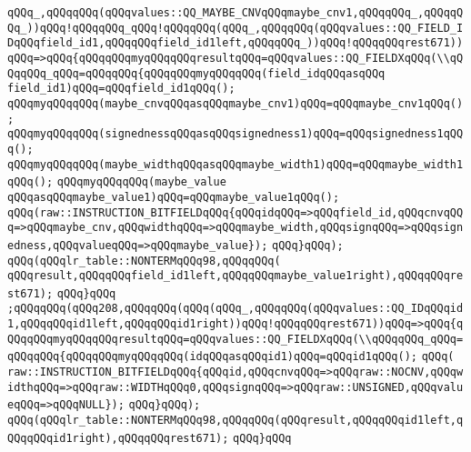 \verb|qQQq_,qQQqqQQq(qQQqvalues::QQ_MAYBE_CNVqQQqmaybe_cnv1,qQQqqQQq_,qQQqqQQq_))qQQq!qQQqqQQq_qQQq!qQQqqQQq(qQQq_,qQQqqQQq(qQQqvalues::QQ_FIELD_IDqQQqfield_id1,qQQqqQQqfield_id1left,qQQqqQQq_))qQQq!qQQqqQQqrest671))qQQq=>qQQq{qQQqqQQqmyqQQqqQQqresultqQQq=qQQqvalues::QQ_FIELDXqQQq(\\qQQqqQQq_qQQq=qQQqqQQq{qQQqqQQqmyqQQqqQQq(field_idqQQqasqQQq|\newline
\verb|field_id1)qQQq=qQQqfield_id1qQQq();|\newline
\verb|qQQqmyqQQqqQQq(maybe_cnvqQQqasqQQqmaybe_cnv1)qQQq=qQQqmaybe_cnv1qQQq();|\newline
\verb|qQQqmyqQQqqQQq(signednessqQQqasqQQqsignedness1)qQQq=qQQqsignedness1qQQq();|\newline
\verb|qQQqmyqQQqqQQq(maybe_widthqQQqasqQQqmaybe_width1)qQQq=qQQqmaybe_width1qQQq();|\newline
\verb|qQQqmyqQQqqQQq(maybe_value|\newline
\verb|qQQqasqQQqmaybe_value1)qQQq=qQQqmaybe_value1qQQq();|\newline
\verb|qQQq(raw::INSTRUCTION_BITFIELDqQQq{qQQqidqQQq=>qQQqfield_id,qQQqcnvqQQq=>qQQqmaybe_cnv,qQQqwidthqQQq=>qQQqmaybe_width,qQQqsignqQQq=>qQQqsignedness,qQQqvalueqQQq=>qQQqmaybe_value});|\newline
\verb|qQQq}qQQq);|\newline
\verb|qQQq(qQQqlr_table::NONTERMqQQq98,qQQqqQQq(|\newline
\verb|qQQqresult,qQQqqQQqfield_id1left,qQQqqQQqmaybe_value1right),qQQqqQQqrest671);|\newline
\verb|qQQq}qQQq|\newline
\verb|;qQQqqQQq(qQQq208,qQQqqQQq(qQQq(qQQq_,qQQqqQQq(qQQqvalues::QQ_IDqQQqid1,qQQqqQQqid1left,qQQqqQQqid1right))qQQq!qQQqqQQqrest671))qQQq=>qQQq{qQQqqQQqmyqQQqqQQqresultqQQq=qQQqvalues::QQ_FIELDXqQQq(\\qQQqqQQq_qQQq=qQQqqQQq{qQQqqQQqmyqQQqqQQq(idqQQqasqQQqid1)qQQq=qQQqid1qQQq();|\newline
\verb|qQQq(|\newline
\verb|raw::INSTRUCTION_BITFIELDqQQq{qQQqid,qQQqcnvqQQq=>qQQqraw::NOCNV,qQQqwidthqQQq=>qQQqraw::WIDTHqQQq0,qQQqsignqQQq=>qQQqraw::UNSIGNED,qQQqvalueqQQq=>qQQqNULL});|\newline
\verb|qQQq}qQQq);|\newline
\verb|qQQq(qQQqlr_table::NONTERMqQQq98,qQQqqQQq(qQQqresult,qQQqqQQqid1left,qQQqqQQqid1right),qQQqqQQqrest671);|\newline
\verb|qQQq}qQQq|\newline

